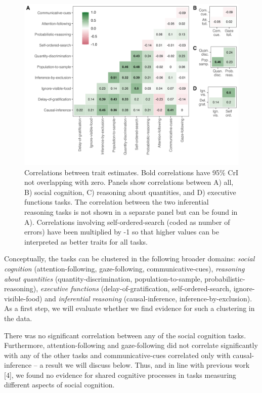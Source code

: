 \documentclass[
  man,floatsintext]{apa6}
\begin{document}
\begin{figure}

{\centering \includegraphics[width=1\linewidth]{../visuals/task_level_cor} 

}

\caption{Correlations between trait estimates. Bold correlations have 95\% CrI not overlapping with zero. Panels show correlations between A) all, B) social cognition, C) reasoning about quantities, and D) executive functions tasks. The correlation between the two inferential reasoning tasks is not shown in a separate panel but can be found in A). Correlations involving self-ordered-search (coded as number of errors) have been multiplied by -1 so that higher values can be interpreted as better traits for all tasks.}\label{fig:figcor}
\end{figure}

Conceptually, the tasks can be clustered in the following broader domains: \emph{social cognition} (attention-following, gaze-following, communicative-cues), \emph{reasoning about quantities} (quantity-discrimination, population-to-sample, probabilistic-reasoning), \emph{executive functions} (delay-of-gratification, self-ordered-search, ignore-visible-food) and \emph{inferential reasoning} (causal-inference, inference-by-exclusion). As a first step, we will evaluate whether we find evidence for such a clustering in the data.

There was no significant correlation between any of the social cognition tasks. Furthermore, attention-following and gaze-following did not correlate significantly with any of the other tasks and communicative-cues correlated only with causal-inference -- a result we will discuss below. Thus, and in line with previous work {[}4{]}, we found no evidence for shared cognitive processes in tasks measuring different aspects of social cognition.
\end{document}
